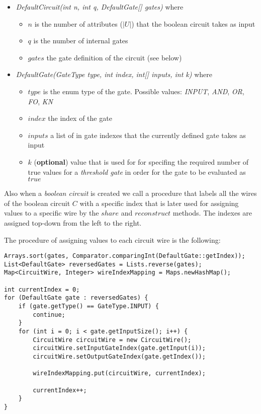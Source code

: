 \documentclass[12pt]{article}
\begin{document}
\begin{itemize}
    \item \textit{DefaultCircuit(int n, int q, DefaultGate[] gates)} where
    \begin{itemize}
        \item $n$ is the number of attributes ($|U|$) that the boolean circuit takes as input
        \item $q$ is the number of internal gates
        \item $gates$ the gate definition of the circuit (see below)
    \end{itemize}
\end{itemize}

\begin{itemize}
    \item \textit{DefaultGate(GateType type, int index, int[] inputs, int k)} where
    \begin{itemize}
        \item $type$ is the enum type of the gate. Possible values: \textit{INPUT}, \textit{AND}, \textit{OR}, \textit{FO}, \textit{KN}
        \item $index$ the index of the gate
        \item $inputs$ a list of in gate indexes that the currently defined gate takes as input
        \item $k$ (\textbf{optional}) value that is used for for specifing the required number of true values for a \textit{threshold gate} in order for the gate to be evaluated as $true$
    \end{itemize}
\end{itemize}

Also when a \textit{boolean circuit} is created we call a procedure that labels all the wires of the boolean circuit $C$ with a specific index that is later used for assigning values to a specific wire by the $share$ and $reconstruct$ methods. The indexes are assigned top-down from the left to the right.

The procedure of assigning values to each circuit wire is the following:

\begin{lstlisting}
Arrays.sort(gates, Comparator.comparingInt(DefaultGate::getIndex));
List<DefaultGate> reversedGates = Lists.reverse(gates);
Map<CircuitWire, Integer> wireIndexMapping = Maps.newHashMap();

int currentIndex = 0;
for (DefaultGate gate : reversedGates) {
    if (gate.getType() == GateType.INPUT) {
        continue;
    }
    for (int i = 0; i < gate.getInputSize(); i++) {
        CircuitWire circuitWire = new CircuitWire();
        circuitWire.setInputGateIndex(gate.getInput(i));
        circuitWire.setOutputGateIndex(gate.getIndex());

        wireIndexMapping.put(circuitWire, currentIndex);

        currentIndex++;
    }
}
\end{lstlisting}
\end{document}
